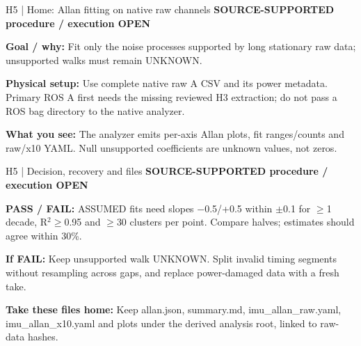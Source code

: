 \documentclass[aspectratio=169,12pt,t]{beamer}
\newcommand{\evidence}[1]{{\small\bfseries\color{teal!70!black}#1}\par\medskip}
\begin{document}
\begin{frame}{H5 | Home: Allan fitting on native raw channels}
\evidence{SOURCE-SUPPORTED procedure / execution OPEN}
\textbf{Goal / why:} Fit only the noise processes supported by long stationary raw data; unsupported walks must remain UNKNOWN.\par\medskip\textbf{Physical setup:} Use complete native raw A CSV and its power metadata. Primary ROS A first needs the missing reviewed H3 extraction; do not pass a ROS bag directory to the native analyzer.\par\medskip\textbf{What you see:} The analyzer emits per-axis Allan plots, fit ranges/counts and raw/x10 YAML. Null unsupported coefficients are unknown values, not zeros.
\end{frame}
\begin{frame}{H5 | Decision, recovery and files}
\evidence{SOURCE-SUPPORTED procedure / execution OPEN}
\textbf{PASS / FAIL:} ASSUMED fits need slopes −0.5/+0.5 within $\pm$0.1 for $\geq$1 decade, R$^2$$\geq$0.95 and $\geq$30 clusters per point. Compare halves; estimates should agree within 30\%.\par\medskip\textbf{If FAIL:} Keep unsupported walk UNKNOWN. Split invalid timing segments without resampling across gaps, and replace power-damaged data with a fresh take.\par\medskip\textbf{Take these files home:} Keep allan.json, summary.md, imu\_allan\_raw.yaml, imu\_allan\_x10.yaml and plots under the derived analysis root, linked to raw-data hashes.
\end{frame}
\end{document}
